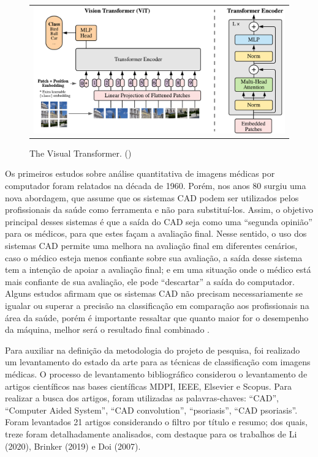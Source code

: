 \begin{figure}[h]
  \centering
    \begin{tabular}{c}
      \includegraphics[scale=0.4]{images/model_scheme.pdf}
    \end{tabular}
    \caption{The Visual Transformer. ()}
    \label{fig:vit-arch}
\end{figure}

Os primeiros estudos sobre análise quantitativa de imagens médicas por computador foram relatados na década de 1960. Porém, nos anos 80 surgiu uma nova abordagem, que assume que os sistemas CAD podem ser utilizados pelos profissionais da saúde como ferramenta e não para substituí-los. Assim, o objetivo principal desses sistemas é que a saída do CAD seja como uma “segunda opinião” para os médicos, para que estes façam a avaliação final. Nesse sentido, o uso dos sistemas CAD permite uma melhora na avaliação final em diferentes cenários, caso o médico esteja menos confiante sobre sua avaliação, a saída desse sistema tem a intenção de apoiar a avaliação final; e em uma situação onde o médico está mais confiante de sua avaliação, ele pode “descartar” a saída do computador. Alguns estudos afirmam que os sistemas CAD não precisam necessariamente se igualar ou superar a precisão na classificação em comparação aos profissionais na área da saúde, porém é importante ressaltar que quanto maior for o desempenho da máquina, melhor será o resultado final combinado \cite{DOI2007198}.


Para auxiliar na definição da metodologia do projeto de pesquisa, foi realizado um levantamento do estado da arte para as técnicas de classificação com imagens médicas. O processo de levantamento bibliográfico considerou o levantamento de artigos científicos nas bases científicas MDPI, IEEE, Elsevier e Scopus. Para realizar a busca dos artigos, foram utilizadas as palavras-chaves: “CAD”, “Computer Aided System”, “CAD convolution”, “psoriasis”, “CAD psoriasis”. Foram levantados 21 artigos considerando o filtro por título e resumo; dos quais, treze foram detalhadamente analisados, com destaque para os trabalhos de Li (2020), Brinker (2019) e Doi (2007).



